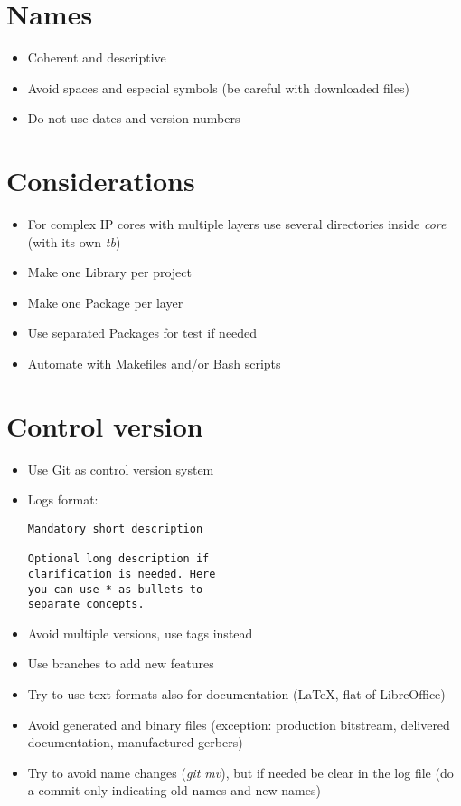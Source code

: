 \documentclass{article}
\begin{document}
\begin{multicols}{3}
  \section*{Names}
    \begin{itemize}
      \item Coherent and descriptive
      \item Avoid spaces and especial symbols (be careful with downloaded files)
      \item Do not use dates and version numbers
    \end{itemize}
  \section*{Considerations}
    \begin{itemize}
      \item For complex IP cores with multiple layers use several directories inside \textit{core}
            (with its own \textit{tb})
      \item Make one Library per project
      \item Make one Package per layer
      \item Use separated Packages for test if needed
      \item Automate with Makefiles and/or Bash scripts
    \end{itemize}
  \section*{Control version}
    \begin{itemize}
      \item Use Git as control version system
      \item Logs format:
        \begin{lstlisting}[]
Mandatory short description

Optional long description if
clarification is needed. Here
you can use * as bullets to
separate concepts.
        \end{lstlisting}
      \item Avoid multiple versions, use tags instead
      \item Use branches to add new features
      \item Try to use text formats also for documentation (LaTeX, flat of LibreOffice)
      \item Avoid generated and binary files (exception: production bitstream, delivered
            documentation, manufactured gerbers)
      \item Try to avoid name changes (\textit{git mv}), but if needed be clear in the log file
            (do a commit only indicating old names and new names)
    \end{itemize}
\end{multicols}
\newpage
{}
\end{document}
